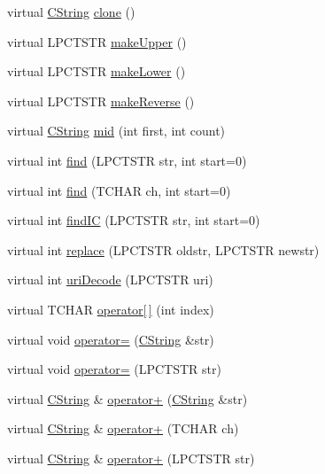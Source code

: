 \begin{DoxyCompactItemize}
\item 
virtual \hyperlink{class_c_string}{C\-String} \hyperlink{class_c_string_aeebb301ee8968688fd6ea8029a95ce9c}{clone} ()
\item 
virtual L\-P\-C\-T\-S\-T\-R \hyperlink{class_c_string_a7a027f50c1bede9a37d12ec9d2cc6616}{make\-Upper} ()
\item 
virtual L\-P\-C\-T\-S\-T\-R \hyperlink{class_c_string_af4236022a2befbcee7c1eaad21ba6798}{make\-Lower} ()
\item 
virtual L\-P\-C\-T\-S\-T\-R \hyperlink{class_c_string_a0b2512a4d0efb8c0317ef7a969268f07}{make\-Reverse} ()
\item 
virtual \hyperlink{class_c_string}{C\-String} \hyperlink{class_c_string_aae1e4a3db1f724363a300d706eae78b8}{mid} (int first, int count)
\item 
virtual int \hyperlink{class_c_string_a34ca981fe4599b24ed4312ee95a7f008}{find} (L\-P\-C\-T\-S\-T\-R str, int start=0)
\item 
virtual int \hyperlink{class_c_string_a225a9d464e22c27b750749426906c308}{find} (T\-C\-H\-A\-R ch, int start=0)
\item 
virtual int \hyperlink{class_c_string_a0d1d84239f8a01f8dd4e012fddc63cbe}{find\-I\-C} (L\-P\-C\-T\-S\-T\-R str, int start=0)
\item 
virtual int \hyperlink{class_c_string_a2330b9d10792cbf3dec9ccd747c67da1}{replace} (L\-P\-C\-T\-S\-T\-R oldstr, L\-P\-C\-T\-S\-T\-R newstr)
\item 
virtual int \hyperlink{class_c_string_aade923167835efe164b5e06fb192e176}{uri\-Decode} (L\-P\-C\-T\-S\-T\-R uri)
\item 
virtual T\-C\-H\-A\-R \hyperlink{class_c_string_a198badb5e4ffe29258ae2476836e274a}{operator\mbox{[}$\,$\mbox{]}} (int index)
\item 
virtual void \hyperlink{class_c_string_a68736847dab1a820326697c0321bce63}{operator=} (\hyperlink{class_c_string}{C\-String} \&str)
\item 
virtual void \hyperlink{class_c_string_a1ceee05f01a8bc4b96a25f0bfb3d9a2b}{operator=} (L\-P\-C\-T\-S\-T\-R str)
\item 
virtual \hyperlink{class_c_string}{C\-String} \& \hyperlink{class_c_string_ae4536c8c8913afaebdc72f79bbe02d9d}{operator+} (\hyperlink{class_c_string}{C\-String} \&str)
\item 
virtual \hyperlink{class_c_string}{C\-String} \& \hyperlink{class_c_string_a80701bf9d780b7cfa78930de18a54e5e}{operator+} (T\-C\-H\-A\-R ch)
\item 
virtual \hyperlink{class_c_string}{C\-String} \& \hyperlink{class_c_string_aed0a539d88caa84a10e42c56736b8585}{operator+} (L\-P\-C\-T\-S\-T\-R str)

\end{DoxyCompactItemize}

